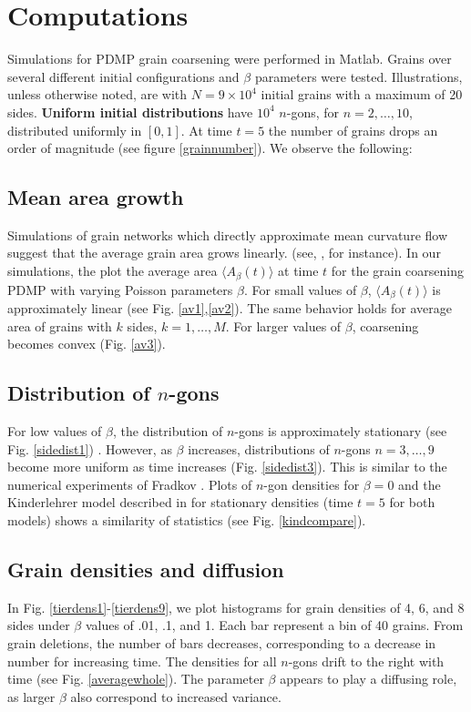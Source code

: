 \section{Computations}\label{computations}
Simulations for PDMP grain coarsening were performed in Matlab. Grains over several different initial configurations and $\beta$ parameters were tested. Illustrations, unless otherwise noted, are with $N= 9\times 10^4$ initial grains with a maximum of 20 sides. \textbf{Uniform initial distributions} have $10^4$ $n$-gons, for $n=2, \dots, 10$, distributed uniformly in $[0,1]$.   At time  $t= 5$ the number of grains drops an order of magnitude (see figure \ref{grainnumber}).  We observe the following:
\subsection*{Mean area growth}
Simulations of grain networks which directly approximate mean curvature flow suggest that the average grain area grows linearly.   (see, \cite{elsey2009diffusion,anderson1984computer,wakai2000three}, for instance). In our simulations, the plot the average area $\langle A_\beta(t)\rangle$ at time $t$ for the grain coarsening PDMP with varying Poisson parameters $\beta$. For small values of $\beta$,   $\langle A_\beta(t)\rangle$ is approximately linear (see Fig. \ref{av1},\ref{av2}).  The same behavior holds for average area of grains with $k$ sides, $k = 1, \dots, M$. For larger values of $\beta$, coarsening becomes convex (Fig. \ref{av3}).

\subsection*{Distribution of $n$-gons} For low values of $\beta$, the distribution of $n$-gons is approximately stationary (see Fig. \ref{sidedist1}) .  However, as $\beta$ increases, distributions of  $n$-gons $n= 3, \dots, 9$ become more uniform  as time increases (Fig. \ref{sidedist3}). This is similar to the numerical experiments of Fradkov \cite{fra881}.   Plots of $n$-gon densities for $\beta = 0$ and the Kinderlehrer model described in \cite{kin06} for stationary densities (time $t= 5$ for both models) shows a similarity of  statistics (see Fig. \ref{kindcompare}).    

 \subsection*{Grain densities and diffusion} In Fig. \ref{tierdens1}-\ref{tierdens9}, we plot histograms for grain densities of 4, 6, and 8 sides under $\beta$ values of .01, .1, and 1.  Each bar represent a bin of 40 grains. From grain deletions, the number of bars decreases, corresponding to a decrease in number for increasing time.  The densities for all $n$-gons drift to the right with time (see Fig. \ref{averagewhole}).  The parameter $\beta$ appears to play a diffusing role, as larger $\beta$ also correspond to increased variance.  
   
